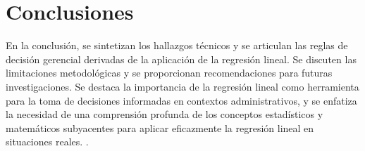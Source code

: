 {\clearpage
\section{Conclusiones}
En la conclusión, se sintetizan los hallazgos técnicos y se articulan las reglas de decisión gerencial derivadas de la aplicación de la regresión lineal. Se discuten las limitaciones metodológicas y se proporcionan recomendaciones para futuras investigaciones. Se destaca la importancia de la regresión lineal como herramienta para la toma de decisiones informadas en contextos administrativos, y se enfatiza la necesidad de una comprensión profunda de los conceptos estadísticos y matemáticos subyacentes para aplicar eficazmente la regresión lineal en situaciones reales. \citep{anderson2012,lind2012,wackerly2010,diazRodriguez2022}.
}

